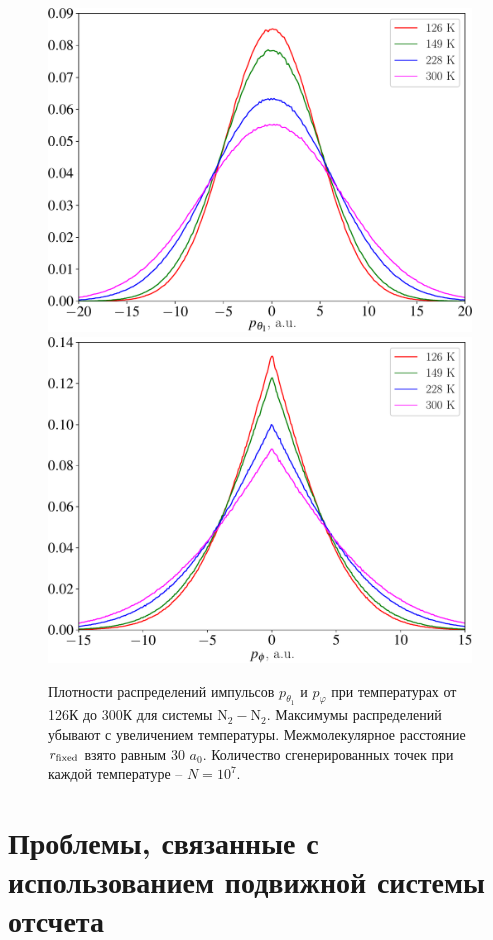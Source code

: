 \begin{figure}[H]
    \centering
    \includegraphics[width=0.75\linewidth]{./pictures/polyatom_distributions/pTheta1-crop.pdf} \\
    \includegraphics[width=0.75\linewidth]{./pictures/polyatom_distributions/pPhi-crop.pdf}
    \caption{Плотности распределений импульсов $p_{\theta_1}$ и $p_\varphi$ при температурах от 126К до 300К для системы N$_2-$N$_2$. Максимумы распределений убывают с увеличением температуры. Межмолекулярное расстояние $r_\text{fixed}$ взято равным 30 $a_0$. Количество сгенерированных точек при каждой температуре -- $N = 10^7$.}
    \label{fig:polyatom-distributions}
\end{figure}

\section{Проблемы, связанные с использованием подвижной системы отсчета}

